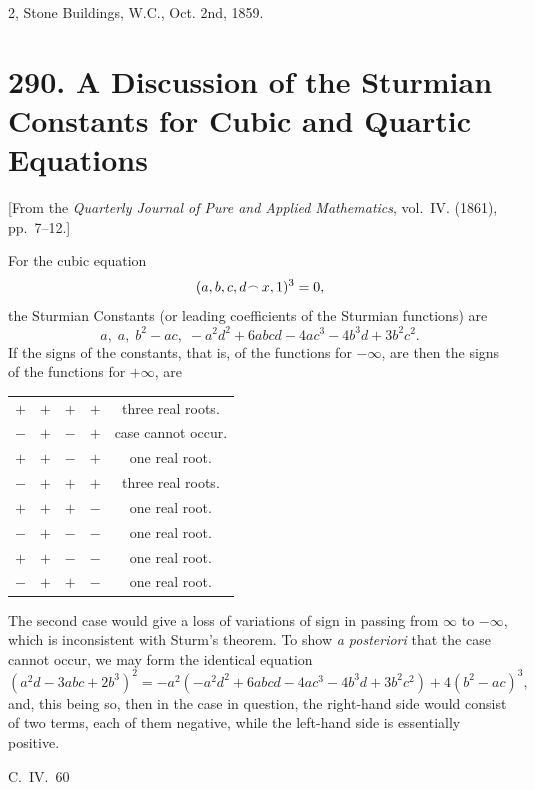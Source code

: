 \documentclass[11pt,a4paper]{book}
\begin{document}
\hfill 2, Stone Buildings, W.C., Oct. 2nd, 1859.



\newpage
\section*{290. A Discussion of the Sturmian Constants for Cubic and Quartic Equations}
\label{sec:290}

[From the \textit{Quarterly Journal of Pure and Applied Mathematics}, vol.~IV. (1861), pp.~7--12.]

For the cubic equation
\[
(a, b, c, d \mathbin{\vcenter{\hbox{$\scriptstyle\!\frown$}}} x, 1)^3 = 0,
\]
the Sturmian Constants (or leading coefficients of the Sturmian functions) are
\[
a,\; a,\; b^2 - ac,\; -a^2d^2 + 6abcd - 4ac^3 - 4b^3d + 3b^2c^2.
\]
If the signs of the constants, that is, of the functions for $-\infty$, are then the signs of the functions for $+\infty$, are
\begin{center}
\begin{tabular}{cccc|c}
$+$ & $+$ & $+$ & $+$ & three real roots.\\
$-$ & $+$ & $-$ & $+$ & case cannot occur.\\
$+$ & $+$ & $-$ & $+$ & one real root.\\
$-$ & $+$ & $+$ & $+$ & three real roots.\\
$+$ & $+$ & $+$ & $-$ & one real root.\\
$-$ & $+$ & $-$ & $-$ & one real root.\\
$+$ & $+$ & $-$ & $-$ & one real root.\\
$-$ & $+$ & $+$ & $-$ & one real root.
\end{tabular}
\end{center}

The second case would give a loss of variations of sign in passing from $\infty$ to $-\infty$, which is inconsistent with Sturm's theorem. To show \textit{a posteriori} that the case cannot occur, we may form the identical equation
\[
(a^2d - 3abc + 2b^3)^2 = -a^2(-a^2d^2 + 6abcd - 4ac^3 - 4b^3d + 3b^2c^2) + 4(b^2 - ac)^3,
\]
and, this being so, then in the case in question, the right-hand side would consist of two terms, each of them negative, while the left-hand side is essentially positive.

\hfill C.~IV.\ 60
\end{document}
